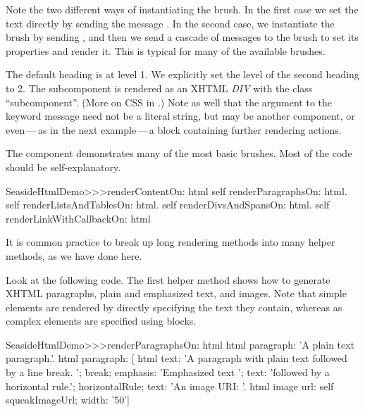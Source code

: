 \documentclass[a4paper,10pt,twoside]{book}
\begin{document}
Note the two different ways of instantiating the  brush.
In the first case we set the text directly by sending the message .
In the second case, we instantiate the brush by sending , and then we send a cascade of messages to the brush to set its properties and render it.
This is typical for many of the available brushes.



The default heading is at level 1.
We explicitly set the level of the second heading to 2.
The subcomponent is rendered as an XHTML \emph{DIV} with the  class ``subcomponent''.
(More on CSS in .)
Note as well that the argument to the  keyword message need not be a literal string, but may be another component, or even\,---\,as in the next example\,---\,a block containing further rendering actions.

The  component demonstrates many of the most basic brushes.
Most of the code should be self-explanatory.

\begin{code}{}
SeasideHtmlDemo>>>renderContentOn: html 
	self renderParagraphsOn: html.
	self renderListsAndTablesOn: html.
	self renderDivsAndSpansOn: html.
	self renderLinkWithCallbackOn: html
\end{code}

It is common practice to break up long rendering methods into many helper methods, as we have done here.


Look at the following code.  
The first helper method shows how to generate XHTML paragraphs, plain and emphasized text, and images.
Note that simple elements are rendered by directly specifying the text they contain, whereas as complex elements are specified using blocks.

\begin{code}{}
SeasideHtmlDemo>>>renderParagraphsOn: html 
	html paragraph: 'A plain text paragraph.'.
	html paragraph: [
		html
			text: 'A paragraph with plain text followed by a line break. ';
			break;
			emphasis: 'Emphasized text ';
			text: 'followed by a horizontal rule.';
			horizontalRule;
			text: 'An image URI: '.
		html image
			url: self squeakImageUrl;
			width: '50']
\end{code}
\end{document}
